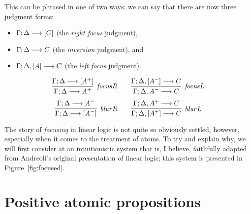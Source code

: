  This can be phrased
in one of two ways: we can say that there are now three judgment
forms:
\begin{itemize}
\item ${\Gamma};{\Delta} \longrightarrow [{C}] \mathstrut$ (the {\it right focus} judgment),
\item ${\Gamma};{\Delta} \longrightarrow {C} \mathstrut$ (the {\it inversion} judgment), and
\item ${\Gamma};{\Delta}, [{A}] \longrightarrow {C} \mathstrut$ (the {\it left focus} judgment).
\end{itemize}

\[
\infer[{\it focus}R]
{\seq{\Gamma}{\Delta}{A^+}}
{\seq{\Gamma}{\Delta}{[A^+]}}
\qquad
\infer[{\it focus}L]
{\seq{\Gamma}{\Delta,A^-}{C}}
{\seq{\Gamma}{\Delta,[A^-]}{C}}
\]\[
\infer[{\it blur}R]
{\seq{\Gamma}{\Delta}{[A^-]}}
{\seq{\Gamma}{\Delta}{A^-}}
\qquad
\infer[{\it blur}L]
{\seq{\Gamma}{\Delta, [A^+]}{C}}
{\seq{\Gamma}{\Delta, A^+}{C}}
\]


The story of {\it focusing} in linear logic is not quite so 
obviously settled, however, especially when it comes to the treatment
of atoms. To try and explain why, we will first consider at 
an intuitionistic system that is, I believe, faithfully adapted from 
Andreoli's original presentation of linear logic; this system is
presented in Figure~\ref{fig:focused}.

\section{Positive atomic propositions}